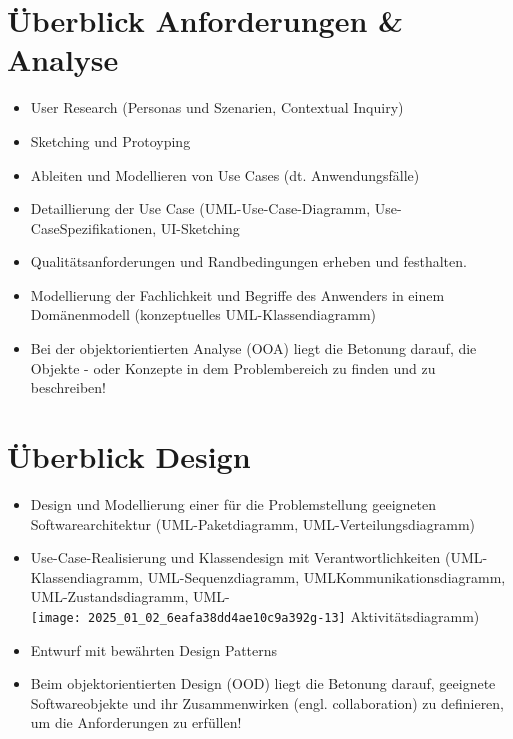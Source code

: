\section*{Überblick Anforderungen \& Analyse}
\begin{itemize}
  \item User Research (Personas und Szenarien, Contextual Inquiry)
  \item Sketching und Protoyping
  \item Ableiten und Modellieren von Use Cases (dt. Anwendungsfälle)
  \item Detaillierung der Use Case (UML-Use-Case-Diagramm, Use-CaseSpezifikationen, UI-Sketching
  \item Qualitätsanforderungen und Randbedingungen erheben und festhalten.
  \item Modellierung der Fachlichkeit und Begriffe des Anwenders in einem Domänenmodell (konzeptuelles UML-Klassendiagramm)
  \item Bei der objektorientierten Analyse (OOA) liegt die Betonung darauf, die Objekte - oder Konzepte in dem Problembereich zu finden und zu beschreiben!
\end{itemize}

\section*{Überblick Design}
\begin{itemize}
  \item Design und Modellierung einer für die Problemstellung geeigneten Softwarearchitektur (UML-Paketdiagramm, UML-Verteilungsdiagramm)
  \item Use-Case-Realisierung und Klassendesign mit Verantwortlichkeiten (UML-Klassendiagramm, UML-Sequenzdiagramm, UMLKommunikationsdiagramm, UML-Zustandsdiagramm, UML-\\
\texttt{[image: 2025\_01\_02\_6eafa38dd4ae10c9a392g-13]} Aktivitätsdiagramm)
  \item Entwurf mit bewährten Design Patterns
  \item Beim objektorientierten Design (OOD) liegt die Betonung darauf, geeignete Softwareobjekte und ihr Zusammenwirken (engl. collaboration) zu definieren, um die Anforderungen zu erfüllen!
\end{itemize}

